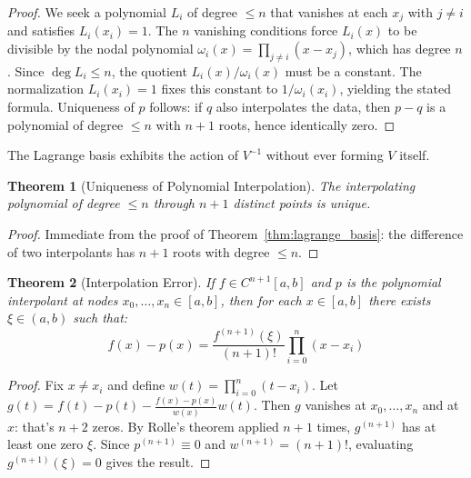 \documentclass[12pt,a4paper]{report}
\theoremstyle{thms}
\newtheorem{theorem}{Theorem}[section]
\theoremstyle{defns}
\begin{document}
\begin{proof}
    We seek a polynomial $L_i$ of degree $\leq n$ that vanishes at each $x_j$ with $j \neq i$ and satisfies $L_i(x_i) = 1$. The $n$ vanishing conditions force $L_i(x)$ to be divisible by the nodal polynomial $\omega_i(x) = \prod_{j \neq i}(x - x_j)$, which has degree $n$. Since $\deg L_i \leq n$, the quotient $L_i(x)/\omega_i(x)$ must be a constant. The normalization $L_i(x_i) = 1$ fixes this constant to $1/\omega_i(x_i)$, yielding the stated formula. Uniqueness of $p$ follows: if $q$ also interpolates the data, then $p - q$ is a polynomial of degree $\leq n$ with $n + 1$ roots, hence identically zero.
\end{proof}

The Lagrange basis exhibits the action of $V^{-1}$ without ever forming $V$ itself.

\begin{theorem}[Uniqueness of Polynomial Interpolation]
    \label{thm:interp_unique}
    The interpolating polynomial of degree $\leq n$ through $n + 1$ distinct points is unique.
\end{theorem}

\begin{proof}
    Immediate from the proof of Theorem~\ref{thm:lagrange_basis}: the difference of two interpolants has $n + 1$ roots with degree $\leq n$.
\end{proof}

\begin{theorem}[Interpolation Error]
    If $f \in C^{n+1}[a, b]$ and $p$ is the polynomial interpolant at nodes $x_0, \ldots, x_n \in [a, b]$, then for each $x \in [a, b]$ there exists $\xi \in (a, b)$ such that:
    \begin{equation}
        f(x) - p(x) = \dfrac{f^{(n+1)}(\xi)}{(n+1)!}\prod_{i=0}^{n}(x - x_i)
        \label{eq:interp_error}
    \end{equation}
\end{theorem}

\begin{proof}
    Fix $x \neq x_i$ and define $w(t) = \prod_{i=0}^{n}(t - x_i)$. Let $g(t) = f(t) - p(t) - \frac{f(x) - p(x)}{w(x)}w(t)$. Then $g$ vanishes at $x_0, \ldots, x_n$ and at $x$: that's $n + 2$ zeros. By Rolle's theorem applied $n + 1$ times, $g^{(n+1)}$ has at least one zero $\xi$. Since $p^{(n+1)} \equiv 0$ and $w^{(n+1)} = (n+1)!$, evaluating $g^{(n+1)}(\xi) = 0$ gives the result.
\end{proof}
\end{document}
